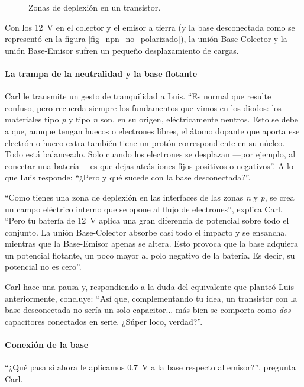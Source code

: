 \begin{figure}[!ht]
  \centering
  
  \caption{Zonas de deplexión en un transistor.}
  \label{fig_zona_de_deplexión}
\end{figure}

Con los \qty{12}{\volt} en el colector y el emisor a tierra (y la base desconectada como se representó en la figura \ref{fig_npn_no_polarizado}), la unión Base-Colector y la unión Base-Emisor sufren un pequeño desplazamiento de cargas.

\paragraph{La trampa de la neutralidad y la base flotante} Carl le transmite un gesto de tranquilidad a Luis. ``Es normal que resulte confuso, pero recuerda siempre los fundamentos que vimos en los diodos: los materiales tipo \emph{p} y tipo \emph{n} son, en su origen, eléctricamente neutros. Esto se debe a que, aunque tengan huecos o electrones libres, el átomo dopante que aporta ese electrón o hueco extra también tiene un protón correspondiente en su núcleo. Todo está balanceado. Solo cuando los electrones se desplazan —por ejemplo, al conectar una batería— es que dejas atrás iones fijos positivos o negativos''. A lo que Luis responde: ``¿Pero y qué sucede con la base desconectada?''.

``Como tienes una zona de deplexión en las interfaces de las zonas \emph{n} y \emph{p}, se crea un campo eléctrico interno que se opone al flujo de electrones'', explica Carl. ``Pero tu batería de \qty{12}{\volt} aplica una gran diferencia de potencial sobre todo el conjunto. La unión Base-Colector absorbe casi todo el impacto y se ensancha, mientras que la Base-Emisor apenas se altera. Esto provoca que la base adquiera un potencial flotante, un poco mayor al polo negativo de la batería. Es decir, su potencial no es cero''. 

Carl hace una pausa y, respondiendo a la duda del equivalente que planteó Luis anteriormente, concluye: ``Así que, complementando tu idea, un transistor con la base desconectada no sería un solo capacitor... más bien se comporta como \emph{dos} capacitores conectados en serie. ¿Súper loco, verdad?''.

\paragraph{Conexión de la base}
``¿Qué pasa si ahora le aplicamos \qty{0.7}{\volt} a la base respecto al emisor?'', pregunta Carl. 

